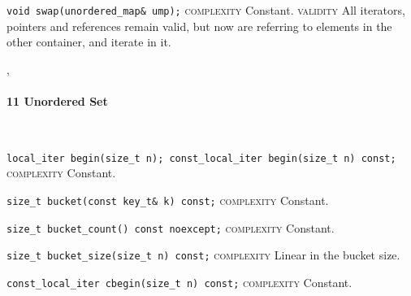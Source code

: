 \noindent{}\hspace*{0.25em}\lstinline[basicstyle=\ttfamily\color{cgreen}]{void swap(unordered_map& ump);} \textsc{complexity} Constant. \textsc{validity} All iterators, pointers and references remain valid, but now are referring to elements in the other container, and iterate in it.\\\vspace{-0.6em}


\sep
{}
\paragraph{11 Unordered Set}\mbox{}\vspace{0.5em}\\
\noindent{}\hspace*{0.25em}\lstinline[basicstyle=\ttfamily\color{cgreen}]{local_iter begin(size_t n); const_local_iter begin(size_t n) const;} \textsc{complexity} Constant.\\\vspace{-0.6em}

\noindent{}\hspace*{0.25em}\lstinline[basicstyle=\ttfamily\color{cgreen}]{size_t bucket(const key_t& k) const;} \textsc{complexity} Constant.\\\vspace{-0.6em}

\noindent{}\hspace*{0.25em}\lstinline[basicstyle=\ttfamily\color{cgreen}]{size_t bucket_count() const noexcept;} \textsc{complexity} Constant.\\\vspace{-0.6em}

\noindent{}\hspace*{0.25em}\lstinline[basicstyle=\ttfamily\color{corange}]{size_t bucket_size(size_t n) const;} \textsc{complexity} Linear in the bucket size.\\\vspace{-0.6em}

\noindent{}\hspace*{0.25em}\lstinline[basicstyle=\ttfamily\color{cgreen}]{const_local_iter cbegin(size_t n) const;} \textsc{complexity} Constant.\\\vspace{-0.6em}

